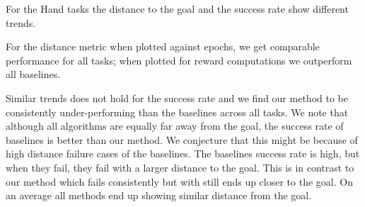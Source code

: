 For the Hand tasks the distance to the goal and the success rate show different trends.

For the distance metric when plotted against epochs, we get comparable
performance for all tasks; when plotted for reward computations we outperform
all baselines.

Similar trends does not hold for the success rate and we find our method to be
consistently under-performing than the baselines across all tasks. We note that
although all algorithms are equally far away from the goal, the success rate of
baselines is better than our method. We conjecture that this might be because of
high distance failure cases of the baselines. The baselines success rate is
high, but when they fail, they fail with a larger distance to the goal. This is
in contrast to our method which fails consistently but with still ends up closer
to the goal. On an average all methods end up showing similar distance from the goal.


